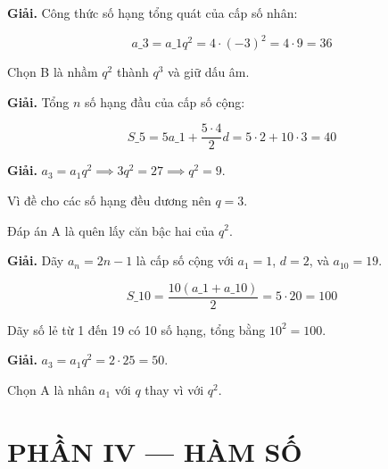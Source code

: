 \documentclass[11pt, a4paper]{article}
\begin{document}
\vspace{0.3cm}
\begin{dapan}[21 — Đáp án A]

\textbf{Giải.} Công thức số hạng tổng quát của cấp số nhân:

$$a\_3 = a\_1 q^2 = 4 \cdot (-3)^2 = 4 \cdot 9 = 36$$

 Chọn B là nhầm $q^2$ thành $q^3$ và giữ dấu âm.


\end{dapan}
\vspace{0.3cm}
\begin{dapan}[22 — Đáp án B]

\textbf{Giải.} Tổng $n$ số hạng đầu của cấp số cộng:

$$S\_5 = 5a\_1 + \dfrac{5 \cdot 4}{2}d = 5 \cdot 2 + 10 \cdot 3 = 40$$


\end{dapan}
\vspace{0.3cm}
\begin{dapan}[23 — Đáp án C]

\textbf{Giải.} $a_3 = a_1 q^2 \implies 3q^2 = 27 \implies q^2 = 9$.

Vì đề cho các số hạng đều dương nên $q = 3$.

 Đáp án A là quên lấy căn bậc hai của $q^2$.


\end{dapan}
\vspace{0.3cm}
\begin{dapan}[24 — Đáp án D]

\textbf{Giải.} Dãy $a_n = 2n - 1$ là cấp số cộng với $a_1 = 1$, $d = 2$, và $a_{10} = 19$.

$$S\_{10} = \dfrac{10(a\_1 + a\_{10})}{2} = 5 \cdot 20 = 100$$

 Dãy số lẻ từ 1 đến 19 có 10 số hạng, tổng bằng $10^2 = 100$.


\end{dapan}
\vspace{0.3cm}
\begin{dapan}[25 — Đáp án B]

\textbf{Giải.} $a_3 = a_1 q^2 = 2 \cdot 25 = 50$.

 Chọn A là nhân $a_1$ với $q$ thay vì với $q^2$.

\section{PHẦN IV — HÀM SỐ}


\end{dapan}
\end{document}
